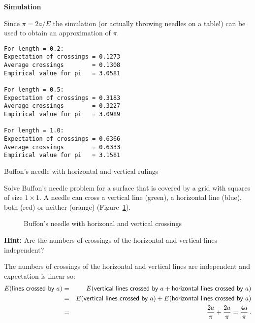 \textbf{Simulation}

Since $\pi=2a/E$ the simulation (or actually throwing needles on a table!) can be used to obtain an approximation of $\pi$.

\begin{verbatim}
For length = 0.2:
Expectation of crossings = 0.1273
Average crossings        = 0.1308
Empirical value for pi   = 3.0581

For length = 0.5:
Expectation of crossings = 0.3183
Average crossings        = 0.3227
Empirical value for pi   = 3.0989

For length = 1.0:
Expectation of crossings = 0.6366
Average crossings        = 0.6333
Empirical value for pi   = 3.1581
\end{verbatim}


\begin{prob}{Buffon's needle with horizontal and vertical rulings}

Solve Buffon's needle problem for a surface that is covered by a grid with squares of size $1\times 1$. A needle can cross a vertical line (green), a horizontal line (blue), both (red) or neither (orange) (Figure~\ref{f.buffon5}).

\begin{figure}[b]
\begin{center}
\end{center}
\caption{Buffon's needle with horizonal and vertical crossings}\label{f.buffon5}
\end{figure}
\end{prob}

\textbf{Hint:} Are the numbers of crossings of the horizontal and vertical lines independent?

\solution{}

The numbers of crossings of the horizontal and vertical lines are independent and expectation is linear so:
\begin{eqnarray*}
E(\textsf{lines crossed by\ } a)&=&E(\textsf{vertical lines crossed by\ } a +
     \textsf{horizontal lines crossed by\ } a)\\
&=&E(\textsf{vertical lines crossed by\ } a) +
   E(\textsf{horizontal lines crossed by\ } a)\\
&=&\displaystyle\frac{2a}{\pi}+\displaystyle\frac{2a}{\pi}=\displaystyle\frac{4a}{\pi}\,.
\end{eqnarray*}


